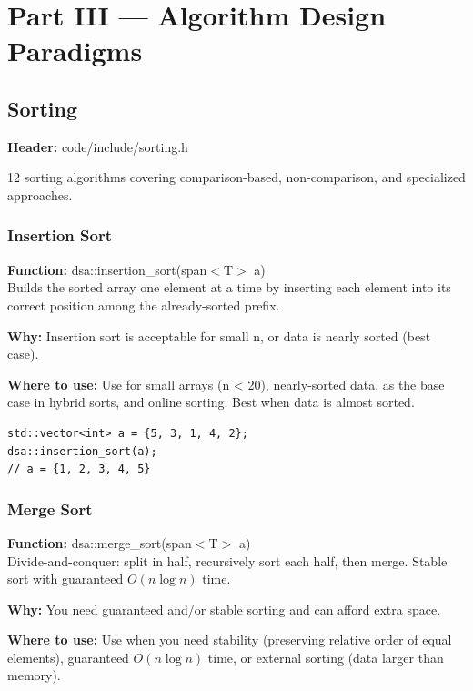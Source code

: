 \documentclass[11pt]{article}
\begin{document}

\section{Part III --- Algorithm Design Paradigms}

\subsection{Sorting}
\textbf{Header:} code/include/sorting.h

12 sorting algorithms covering comparison-based, non-comparison, and specialized approaches.

\subsubsection{Insertion Sort}
\textbf{Function:} dsa::insertion\_sort(span$<$T$>$ a)\\

Builds the sorted array one element at a time by inserting each element into its correct position among the already-sorted prefix.

\textbf{Why:} Insertion sort is acceptable for small n, or data is nearly sorted (best case). \par \textbf{Where to use:} Use for small arrays (n < 20), nearly-sorted data, as the base case in hybrid sorts, and online sorting. Best when data is almost sorted.

\begin{lstlisting}
std::vector<int> a = {5, 3, 1, 4, 2};
dsa::insertion_sort(a);
// a = {1, 2, 3, 4, 5}
\end{lstlisting}

\subsubsection{Merge Sort}
\textbf{Function:} dsa::merge\_sort(span$<$T$>$ a)\\

Divide-and-conquer: split in half, recursively sort each half, then merge. Stable sort with guaranteed \(O(n\log n)\) time.

\textbf{Why:} You need guaranteed and/or stable sorting and can afford extra space. \par \textbf{Where to use:} Use when you need stability (preserving relative order of equal elements), guaranteed \(O(n\log n)\) time, or external sorting (data larger than memory).
\end{document}
